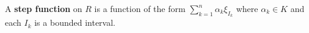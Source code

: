 A \textbf{step function} on $R$ is a function of the form $\sum_{k=1}^{n} \alpha_k \xi_{I_k}$ where $\alpha_k \in K$ and each $I_k$ is a bounded interval.
